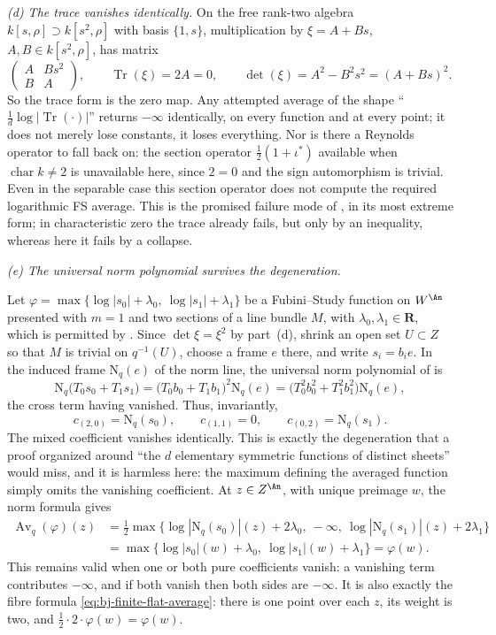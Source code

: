 \begin{example}
\emph{(d) The trace vanishes identically.}
On the free rank-two algebra $k[s,\rho]\supset k[s^2,\rho]$ with basis
$\{1,s\}$, multiplication by $\xi=A+Bs$, $A,B\in k[s^2,\rho]$, has
matrix
\[
 \begin{pmatrix}A & Bs^2\\ B& A\end{pmatrix},
 \qquad
 \operatorname{Tr}(\xi)=2A=0,
 \qquad
 \det(\xi)=A^2-B^2s^2=(A+Bs)^2 .
\]
So the trace form is the zero map.  Any attempted average of the shape
``$\frac1d\log|\operatorname{Tr}(\cdot)|$'' returns $-\infty$
identically, on every function and at every point; it does not merely lose
constants, it loses everything.  Nor is there a Reynolds operator to fall
back on: the section operator $\frac12(1+\iota^*)$ available when
$\operatorname{char}k\ne2$ is unavailable here, since $2=0$ and
the sign automorphism is trivial.  Even in the separable case this
section operator does not compute the required logarithmic FS average.  This is the promised failure mode of
, in its most extreme form; in
characteristic zero the trace already fails, but only by an inequality,
whereas here it fails by a collapse.

\emph{(e) The universal norm polynomial survives the degeneration.}\par\noindent
Let $\varphi=\max\{\log|s_0|+\lambda_0,\ \log|s_1|+\lambda_1\}$ be a
Fubini--Study function on $W^{\An}$ presented with $m=1$ and two sections
of a line bundle $M$, with $\lambda_0,\lambda_1\in\mathbf R$, which is
permitted by .  Since $\det\xi=\xi^2$ by
part~(d), shrink an open set $U\subset Z$ so that $M$ is trivial on
$q^{-1}(U)$, choose a frame $e$ there, and write $s_i=b_i e$.  In the
induced frame $\mathrm N_q(e)$ of
the norm line, the universal norm polynomial of
 is
\[
 \mathrm N_q\bigl(T_0s_0+T_1s_1\bigr)
 =\bigl(T_0b_0+T_1b_1\bigr)^2\mathrm N_q(e)
 =\bigl(T_0^2b_0^2+T_1^2b_1^2\bigr)\mathrm N_q(e),
\]
the cross term having vanished.  Thus, invariantly,
\[
 c_{(2,0)}=\mathrm N_q(s_0),\qquad c_{(1,1)}=0,\qquad
 c_{(0,2)}=\mathrm N_q(s_1).
\]
The mixed coefficient vanishes identically.  This is exactly the
degeneration that a proof organized around ``the $d$ elementary symmetric
functions of distinct sheets'' would miss, and it is harmless here: the
maximum defining the averaged function simply omits the vanishing
coefficient.  At $z\in Z^{\An}$, with unique preimage $w$, the norm formula
gives
\[
 \begin{aligned}
 \operatorname{Av}_q(\varphi)(z)
 &=\tfrac12\max\bigl\{
   \log|\mathrm N_q(s_0)|(z)+2\lambda_0,\ -\infty,\
   \log|\mathrm N_q(s_1)|(z)+2\lambda_1\bigr\}
 \\
 &=\max\bigl\{\log|s_0|(w)+\lambda_0,\
               \log|s_1|(w)+\lambda_1\bigr\}
 =\varphi(w).
 \end{aligned}
\]
This remains valid when one or both pure coefficients vanish: a vanishing
term contributes $-\infty$, and if both vanish then both sides are
$-\infty$.  It is also exactly the fibre formula
\eqref{eq:bj-finite-flat-average}: there is one point over each $z$, its
weight is two, and
$\frac12\cdot2\cdot\varphi(w)=\varphi(w)$.


\end{example}
